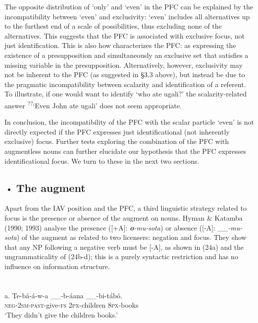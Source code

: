 \documentclass[output=paper]{langsci/langscibook}
\begin{document}
The opposite distribution of ‘only’ and ‘even’ in the PFC can be explained by the incompatibility between ‘even’ and exclusivity: ‘even’ includes all alternatives up to the furthest end of a scale of possibilities, thus excluding none of the alternatives. This suggests that the PFC is associated with exclusive focus, not just identification. This is also how \citet[52]{Walusimbi1996} characterizes the PFC: as expressing the existence of a presupposition and simultaneously an exclusive set that satisfies a missing variable in the presupposition. Alternatively, however, exclusivity may not be inherent to the PFC (as suggested in §3.3 above), but instead be due to the pragmatic incompatibility between scalarity and identification of a referent. To illustrate, if one would want to identify ‘who ate ugali?’ the scalarity-related answer \textsuperscript{??}‘Even John ate ugali’ does not seem appropriate.

  In conclusion, the incompatibility of the PFC with the scalar particle ‘even’ is not directly expected if the PFC expresses just identificational (not inherently exclusive) focus. Further tests exploring the combination of the PFC with augmentless nouns can further elucidate our hypothesis that the PFC expresses identificational focus. We turn to these in the next two sections.

\begin{itemize}
\item \section{ \label{bkm:Ref288127974}The augment}
\end{itemize}

Apart from the IAV position and the PFC, a third linguistic strategy related to focus is the presence or absence of the augment on nouns. Hyman \& Katamba (1990; 1993) analyse the presence ([+A]: \textbf{\textit{o}}\textit{{}-mu-sota}) or absence ([-A]: \textit{\_\_-mu-sota}) of the augment as related to two licensers: negation and focus. They show that any NP following a negative verb must be [-A], as shown in (24a) and the ungrammaticality of (24b-d); this is a purely syntactic restriction and has no influence on information structure.

\chapter[  ]{  }
\gll a.  Te-bá-á-w-a      \_\_-b-áana    \_\_-bi-tábó.\\
       \textsc{neg}{}-\textsc{2sm}{}-\textsc{past}{}-give-\textsc{fs}       \textsc{2px}{}-children       \textsc{8px}{}-books\\
\glt   ‘They didn't give the children books.’
\z
\end{document}

